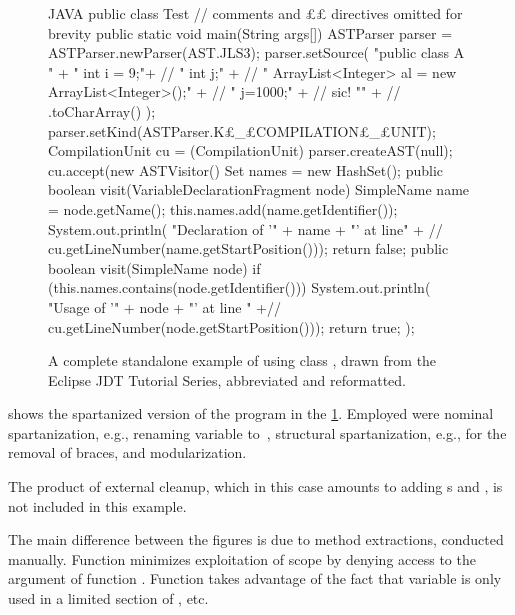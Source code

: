 \begin{figure}[H]
  \caption{A complete standalone example of using class , drawn
    from the Eclipse JDT Tutorial Series, abbreviated and reformatted.}
    \label{figure:eclipse}
    \begin{adjustbox}{max width=\columnwidth}
      \begin{code}[minipage, width=1.13\columnwidth]{JAVA}
public class Test { // comments and ££ directives omitted for brevity
  public static void main(String args[]) {
    ASTParser parser = ASTParser.newParser(AST.JLS3);
    parser.setSource(
      "public class A {\n" +
      " int i = 9;\n"+ //
      " int j;\n" + //
      " ArrayList<Integer> al = new ArrayList<Integer>();\n" + //
      " j=1000;\n" + // sic!
      "}\n" + //
      .toCharArray()
);
    parser.setKind(ASTParser.K£\_£COMPILATION£\_£UNIT);
    CompilationUnit cu = (CompilationUnit) parser.createAST(null);
    cu.accept(new ASTVisitor() {
      Set names = new HashSet();
      public boolean visit(VariableDeclarationFragment node) {
        SimpleName name = node.getName();
        this.names.add(name.getIdentifier());
        System.out.println(
          "Declaration of '" + name + "' at line" + //
          cu.getLineNumber(name.getStartPosition()));
        return false;
      }
      public boolean visit(SimpleName node) {
        if (this.names.contains(node.getIdentifier())) {
          System.out.println(
            "Usage of '" + node + "' at line " +//
            cu.getLineNumber(node.getStartPosition()));
        }
        return true;
      }
    });
  }
}
\end{code}
  \end{adjustbox}
\end{figure}

 shows the spartanized version of the program in
the \cref{figure:eclipse}. Employed were nominal spartanization, e.g., renaming
variable  to~\cc{\$}, structural spartanization, e.g., for the
removal of braces, and modularization.

The product of external cleanup, which in this case amounts to adding
s and , is not included in this example.

The main difference between the figures is due to method extractions, conducted
manually. Function  minimizes exploitation of scope by denying
access to the  argument of function .
Function  takes advantage of the fact that variable
 is only used in a limited section of , etc.


